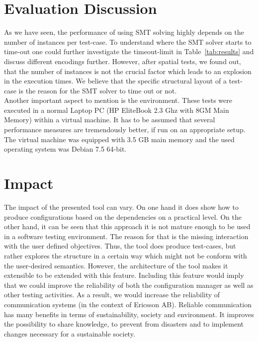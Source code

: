 \section{Evaluation Discussion}\label{sec:eval-discussion}

As we have seen, the performance of using SMT solving highly depends on the number of instances per test-case. To understand where the SMT solver starts to time-out one could further investigate the timeout-limit in Table~\ref{tab:results} and discuss different encodings further. However, after spatial tests, we found out, that the number of instances is not the crucial factor which leads to an explosion in the execution times. We believe that the specific structural layout of a test-case is the reason for the SMT solver to time out or not. \\

Another important aspect to mention is the environment. These tests were executed in a normal Laptop PC (HP EliteBook 2.3 Ghz with 8GM Main Memory) within a virtual machine. It has to be assumed that several performance measures are tremendously better, if run on an appropriate setup. The virtual machine was equipped with 3.5 GB main memory and the used operating system was Debian 7.5 64-bit. 

\section{Impact}\label{sec:impact}

The impact of the presented tool can vary. On one hand it does show how to produce configurations based on the dependencies on a practical level. On the other hand, it can be seen that this approach it is not mature enough to be used in a software testing environment. The reason for that is the missing interaction with the user defined objectives. Thus, the tool does produce test-cases, but rather explores the structure in a certain way which might not be conform with the user-desired semantics. However, the architecture of the tool makes it extensible to be extended with this feature. Including this feature would imply that we could improve the reliability of both the configuration manager as well as other testing activities. As a result, we would increase the reliability of communication systems (in the context of Ericsson AB). Reliable communication has many benefits in terms of sustainability, society and environment. It improves the possibility to share knowledge, to prevent from disasters and to implement changes necessary for a sustainable society.


